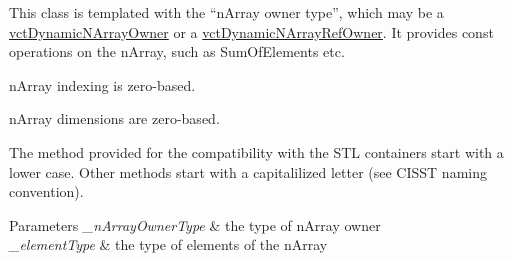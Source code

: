This class is templated with the ``n\-Array owner type'', which may be a \hyperlink{classvct_dynamic_n_array_owner}{vct\-Dynamic\-N\-Array\-Owner} or a \hyperlink{classvct_dynamic_n_array_ref_owner}{vct\-Dynamic\-N\-Array\-Ref\-Owner}. It provides const operations on the n\-Array, such as Sum\-Of\-Elements etc.

n\-Array indexing is zero-\/based.

n\-Array dimensions are zero-\/based.

The method provided for the compatibility with the S\-T\-L containers start with a lower case. Other methods start with a capitalilized letter (see C\-I\-S\-S\-T naming convention).


\begin{DoxyParams}{Parameters}
{\em \-\_\-n\-Array\-Owner\-Type} & the type of n\-Array owner \\
\hline
{\em \-\_\-element\-Type} & the type of elements of the n\-Array \\
\hline
\end{DoxyParams}


